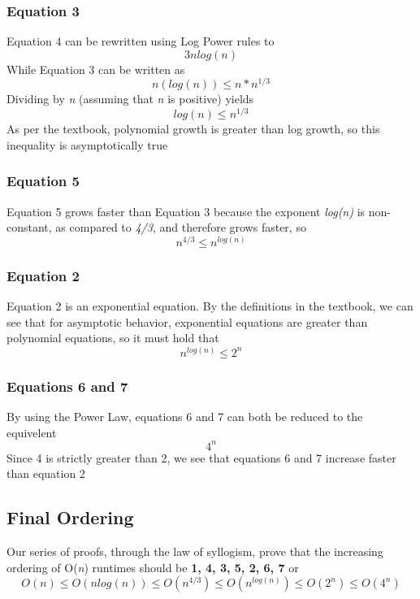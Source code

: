 \documentclass[titlepage]{article}
\numberwithin{equation}{subsection}
\begin{document}
\subsubsection{Equation 3}
    Equation 4 can be rewritten using Log Power rules to 
    \begin{equation}
        3nlog(n)
    \end{equation}
    While Equation 3 can be written as
    \begin{equation}
        n(log(n)) \leq n*n^{1/3}
    \end{equation}
    Dividing by \textit{n} (assuming that \textit{n} is positive) yields 
    \begin{equation}
        log(n) \leq n^{1/3}
    \end{equation}
    As per the textbook, polynomial growth is greater than log growth, so this 
    inequality is asymptotically true
\subsubsection{Equation 5}
    Equation 5 grows faster than Equation 3 because the exponent \textit{log(n)} is
    non-constant, as compared to \textit{4/3}, and therefore grows faster, so
    \begin{equation}
        n^{4/3} \leq n^{log(n)}
    \end{equation}
\subsubsection{Equation 2}
    Equation 2 is an exponential equation.
    By the definitions in the textbook, we can see that for asymptotic behavior,
    exponential equations are greater than polynomial equations, so it must hold that
    \begin{equation}
        n^{log(n)} \leq 2^n
    \end{equation}
\subsubsection{Equations 6 and 7}
    By using the Power Law, equations 6 and 7 can both be reduced to the equivelent
    \begin{equation}
        4^n
    \end{equation}
    Since 4 is strictly greater than 2, we see that equations 6 and 7 increase
    faster than equation 2
\subsection{Final Ordering}
Our series of proofs, through the law of syllogism, prove that the increasing 
ordering of O(\textit{n}) runtimes should be 
\textbf{1, 4, 3, 5, 2, 6, 7} or
\begin{equation}
    O(n) \leq O(nlog(n)) \leq O(n^{4/3}) \leq O(n^{log(n)}) \leq  O(2^n) \leq O(4^n)
\end{equation}
\end{document}
